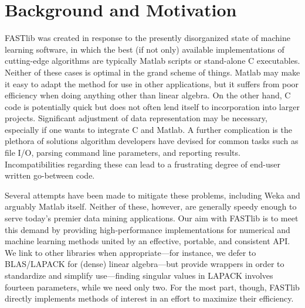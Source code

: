 \documentclass[letter]{report}
\begin{document}
\section {Background and Motivation}
FASTlib was created in response to the presently disorganized state of
machine learning software, in which the best (if not only) available
implementations of cutting-edge algorithms are typically Matlab
scripts or stand-alone C executables.  Neither of these cases is
optimal in the grand scheme of things.  Matlab may make it easy to
adapt the method for use in other applications, but it suffers from
poor efficiency when doing anything other than linear algebra.  On the
other hand, C code is potentially quick but does not often lend itself
to incorporation into larger projects.  Significant adjustment of data
representation may be necessary, especially if one wants to integrate
C and Matlab.  A further complication is the plethora of solutions
algorithm developers have devised for common tasks such as file I/O,
parsing command line parameters, and reporting results.
Incompatibilities regarding these can lead to a frustrating degree of
end-user written go-between code.

Several attempts have been made to mitigate these problems, including
Weka and arguably Matlab itself.  Neither of these, however, are
generally speedy enough to serve today's premier data mining
applications.  Our aim with FASTlib is to meet this demand by
providing high-performance implementations for numerical and machine
learning methods united by an effective, portable, and consistent API.
We link to other libraries when appropriate---for instance, we defer to
BLAS/LAPACK \cite{anderson1999lug} for (dense) linear algebra---but provide wrappers in order
to standardize and simplify use---finding singular values in LAPACK
involves fourteen parameters, while we need only two.  For the most
part, though, FASTlib directly implements methods of interest in an
effort to maximize their efficiency.
\end{document}
